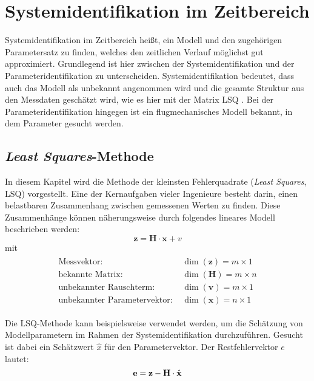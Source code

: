 \chapter{Systemidentifikation im Zeitbereich}
Systemidentifikation im Zeitbereich heißt, ein Modell und den zugehörigen Parametersatz zu finden, welches den zeitlichen Verlauf möglichst gut approximiert. Grundlegend ist hier zwischen der Systemidentifikation und der Parameteridentifikation zu unterscheiden. Systemidentifikation bedeutet, dass auch das Modell als unbekannt angenommen wird und die gesamte Struktur aus den Messdaten geschätzt wird, wie es hier mit der Matrix LSQ . Bei der Parameteridentifikation hingegen ist ein flugmechanisches Modell bekannt, in dem Parameter gesucht werden.

\section{\textit{Least Squares}-Methode}
In diesem Kapitel wird die Methode der kleinsten Fehlerquadrate (\textit{Least Squares}, LSQ) vorgestellt.
Eine der Kernaufgaben vieler Ingenieure besteht darin, einen belastbaren Zusammenhang zwischen gemessenen Werten zu finden. 
Diese Zusammenhänge können näherungsweise durch folgendes lineares Modell beschrieben werden:  
\begin{equation}
    \textbf{z} = \textbf{H}\cdot \textbf{x}+v 
\end{equation}
mit 
\begin{align}
	\begin{split}
		\text{Messvektor: } &\dim{(\textbf{z})} = m\times 1\\
		\text{bekannte Matrix: } &\dim{(\textbf{H})} = m\times n\\
		\text{unbekannter Rauschterm: } &\dim{(\textbf{v})} = m\times1\\
		\text{unbekannter Parametervektor: } &\dim{(\textbf{x})} = n\times 1
		\nonumber
	\end{split}
\end{align}

Die LSQ-Methode kann beispielsweise verwendet werden, um die Schätzung von Modellparametern im Rahmen der 
Systemidentifikation durchzuführen. Gesucht ist dabei ein Schätzwert $\hat{x}$ für den Parametervektor. Der Restfehlervektor 
$e$ lautet:
\begin{equation}
    \textbf{e} = \textbf{z} - \textbf{H}\cdot \hat{\textbf{x}} \\
\end{equation}


